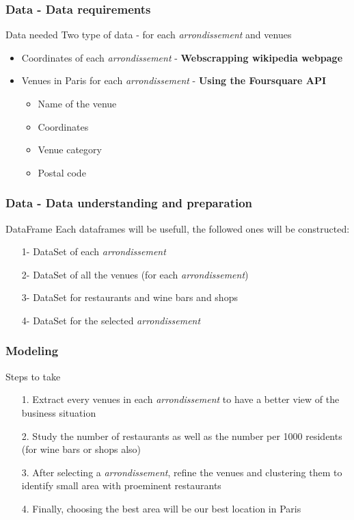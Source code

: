 \documentclass{beamer}
\begin{document}
\begin{frame}
	\frametitle{Data - Data requirements}
	\begin{block}{Data needed}		
		Two type of data - for each \textit{arrondissement} and venues
		\begin{itemize}
			\item Coordinates of each \textit{arrondissement} - \textbf{Webscrapping wikipedia webpage}
			\item Venues in Paris for each \textit{arrondissement} - \textbf{Using the Foursquare API}
			\begin{itemize}
				\item Name of the venue
				\item Coordinates
				\item Venue category
				\item Postal code
			\end{itemize}
		\end{itemize}
	\end{block}
\end{frame}

\begin{frame}
	\frametitle{Data - Data understanding and preparation}
	\begin{block}{DataFrame}
		Each dataframes will be usefull, the followed ones will be constructed:
		\begin{itemize}
			\item[1-] DataSet of each \textit{arrondissement}
			\item[2-] DataSet of all the venues (for each \textit{arrondissement})
			\item[3-] DataSet for restaurants and wine bars and shops
			\item[4-] DataSet for the selected \textit{arrondissement}
		\end{itemize}
	\end{block}
\end{frame}


\begin{frame}
	\frametitle{Modeling}
	\begin{block}{Steps to take}		
		\begin{itemize}
			\item[1.] Extract every venues in each \textit{arrondissement} to have a better view of the business situation
			\item[2.] Study the number of restaurants as well as the number per 1000 residents (for wine bars or shops also)
			\item[3.] After selecting a \textit{arrondissement}, refine the venues and clustering them to identify small area with proeminent restaurants
			\item[4.] Finally, choosing the best area will be our best location in Paris
		\end{itemize}
	\end{block}
\end{frame}
\end{document}
